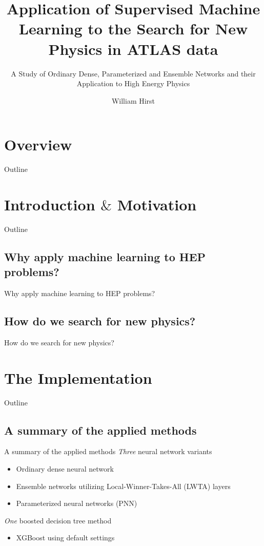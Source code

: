 \documentclass[UKenglish]{beamer}
\author{William Hirst}
\title[Supervised Learning in HEP]{Application of Supervised Machine Learning to the Search for New Physics in ATLAS data}
\subtitle{A Study of Ordinary Dense, Parameterized and Ensemble Networks and their Application to High Energy Physics}
\begin{document}
\section{Overview}

\begin{frame}{Outline}
    \tableofcontents
\end{frame}


\section{Introduction $\&$ Motivation}
\begin{frame}{Outline}
    \tableofcontents[currentsection]
\end{frame}

\subsection{Why apply machine learning to HEP problems?}
\begin{frame}{Why apply machine learning to HEP problems?}
 
\end{frame}


\subsection{How do we search for new physics?}
\begin{frame}{How do we search for new physics?}
 
\end{frame}

\section{The Implementation}
\begin{frame}{Outline}
    \tableofcontents[currentsection]
\end{frame}

\subsection{A summary of the applied methods}
\begin{frame}{A summary of the applied methods}
    \emph{Three} neural network variants
    \begin{itemize}
        \item Ordinary dense neural network
        \item Ensemble networks utilizing Local-Winner-Takes-All (LWTA) layers
        \item Parameterized neural networks (PNN)
    \end{itemize}
    \emph{One} boosted decision tree method
    \begin{itemize}
        \item XGBoost using default settings
    \end{itemize}
\end{frame}
\end{document}
